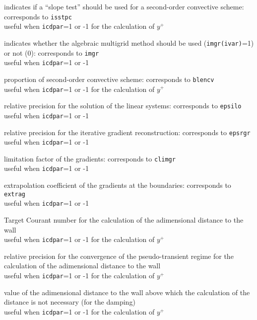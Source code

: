 {indicates if a ``slope test'' should be used for a second-order convective
scheme: corresponds to {\tt isstpc}\\
useful when {\tt icdpar}=1 or -1 for the calculation of $y^+$}

{indicates whether the algebraic
multigrid method should be used ({\tt imgr(ivar)}=1) or not (0): corresponds
to {\tt imgr}\\
useful when {\tt icdpar}=1 or -1}

{proportion of second-order convective scheme: corresponds to {\tt blencv}\\
useful when {\tt icdpar}=1 or -1 for the calculation of $y^+$}

{relative precision for the solution of the linear systems:
corresponds to {\tt epsilo}\\
useful when {\tt icdpar}=1 or -1}

{relative precision for the iterative gradient reconstruction:
corresponds to {\tt epsrgr}\\
useful when {\tt icdpar}=1 or -1}

{limitation factor of the gradients: corresponds to {\tt climgr}\\
useful when {\tt icdpar}=1 or -1}

{extrapolation coefficient of the gradients at the boundaries:
corresponds to {\tt extrag}\\
useful when {\tt icdpar}=1 or -1}

{Target Courant number for the calculation of the adimensional distance
to the wall\\
useful when {\tt icdpar}=1 or -1 for the calculation of $y^+$}

{relative precision for the convergence of the pseudo-transient regime
for the calculation of the adimensional distance to the wall\\
useful when {\tt icdpar}=1 or -1  for the calculation of $y^+$}

{value of the adimensional distance to the wall above which the
calculation of the distance is not necessary (for the damping)\\
useful when {\tt icdpar}=1 or -1 for the calculation of $y^+$}


